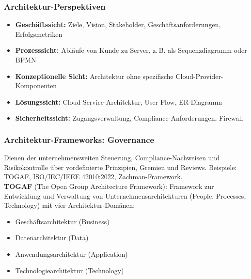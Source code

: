 \subsubsection{Architektur-Perspektiven}
\begin{itemize}
    \item \textbf{Geschäftssicht:} Ziele, Vision, Stakeholder,
          Geschäftsanforderungen, Erfolgsmetriken
    \item \textbf{Prozesssicht:} Abläufe von Kunde zu Server,
          z.\,B. als Sequenzdiagramm oder BPMN
    \item \textbf{Konzeptionelle Sicht:} Architektur ohne
          spezifische Cloud-Provider-Komponenten
    \item \textbf{Lösungssicht:} Cloud-Service-Architektur,
          User Flow, ER-Diagramm
    \item \textbf{Sicherheitssicht:} Zugangsverwaltung,
          Compliance-Anforderungen, Firewall
\end{itemize}

\newpage

\subsubsection{Architektur-Frameworks: Governance}
Dienen der unternehmensweiten Steuerung, Compliance-Nachweisen
und Risikokontrolle über vordefinierte Prinzipien, Gremien und Reviews.
Beispiele: TOGAF, ISO/IEC/IEEE 42010:2022, Zachman-Framework.\\[4pt]
\textbf{TOGAF} (The Open Group Architecture Framework): Framework zur
Entwicklung und Verwaltung von Unternehmensarchitekturen (People,
Processes, Technology) mit vier Architektur-Domänen:
\begin{itemize}
    \item Geschäftsarchitektur (Business)
    \item Datenarchitektur (Data)
    \item Anwendungsarchitektur (Application)
    \item Technologiearchitektur (Technology)
\end{itemize}

